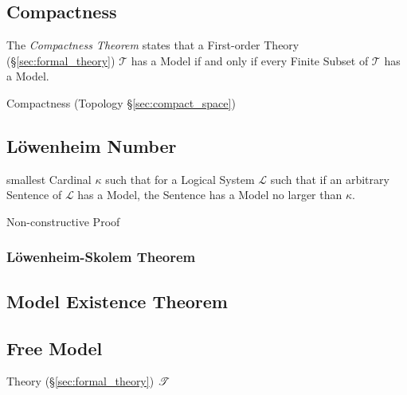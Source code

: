 \subsection{Compactness}\label{sec:compactness}

The \emph{Compactness Theorem} states that a First-order Theory
(\S\ref{sec:formal_theory}) $\mathcal{T}$ has a Model if and only if
every Finite Subset of $\mathcal{T}$ has a Model.

Compactness (Topology \S\ref{sec:compact_space})



\subsection{L\"owenheim Number}\label{sec:lowenheim_number}

smallest Cardinal $\kappa$ such that for a Logical System
$\mathcal{L}$ such that if an arbitrary Sentence of $\mathcal{L}$ has
a Model, the Sentence has a Model no larger than $\kappa$.

Non-constructive Proof



\subsubsection{L\"owenheim-Skolem Theorem}\label{sec:lowenheim_skolem}



\subsection{Model Existence Theorem}\label{sec:model_existence}

\subsection{Free Model}\label{sec:free_model}

Theory (\S\ref{sec:formal_theory}) $\mathscr{T}$

